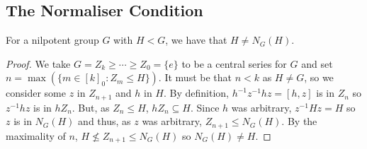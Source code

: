 \subsection{The Normaliser Condition} \label{8.9}

For a nilpotent group $G$ with $H < G$, we have that $H \neq N_G(H)$.

\begin{proof}
    We take $G = Z_k \geq \cdots \geq Z_0 = \{e\}$ to be a central
    series for $G$ and set $n = \max(\{m \in [k]_0 : Z_m \leq H\})$.
    It must be that $n < k$ as $H \neq G$, so we consider some
    $z$ in $Z_{n + 1}$ and $h$ in $H$. By definition, 
    $h^{-1}z^{-1}hz = [h, z]$ is in $Z_n$ so 
    $z^{-1}hz$ is in $hZ_n$. But, as $Z_n \leq H$, $hZ_n \subseteq H$.
    Since $h$ was arbitrary, $z^{-1}Hz = H$ so $z$ is in $N_G(H)$
    and thus, as $z$ was arbitrary, $Z_{n + 1} \leq N_G(H)$. 
    By the maximality of $n$, $H \nleq Z_{n + 1} \leq N_G(H)$
    so $N_G(H) \neq H$.
\end{proof}
